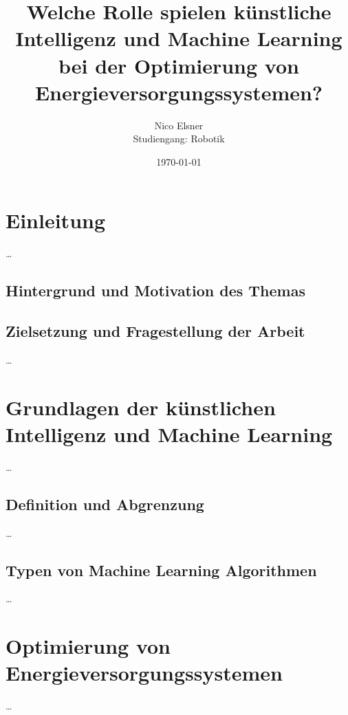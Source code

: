 \documentclass[
11pt, 
a4paper,
DIV = 14,
twoside,
twocolumn, %
parskip =half, %
headsepline, %
openright, %
]{scrreprt}
\begin{document}
	
	\title{Welche Rolle spielen künstliche Intelligenz und Machine Learning bei der Optimierung von Energieversorgungssystemen?}
	\author{Nico Elsner\\
		Studiengang: Robotik}
	\date{\today}
	\maketitle

	\clearpage
	\begingroup
	  \pagestyle{empty}
	  \renewcommand*\chapterpagestyle{empty}
	  \tableofcontents 
	\clearpage
	\endgroup
	
	\thispagestyle{empty}

	\chapter{Einleitung}
	\setcounter{page}{1}
	\ldots
	\section{Hintergrund und Motivation des Themas}
	
	\section{Zielsetzung und Fragestellung der Arbeit}
	\ldots


	\chapter{Grundlagen der künstlichen Intelligenz und Machine Learning}
	\ldots
	\section{Definition und Abgrenzung}
	\ldots
	\section{Typen von Machine Learning Algorithmen}
	\ldots


	\chapter{Optimierung von Energieversorgungssystemen}
	\ldots
\end{document}
